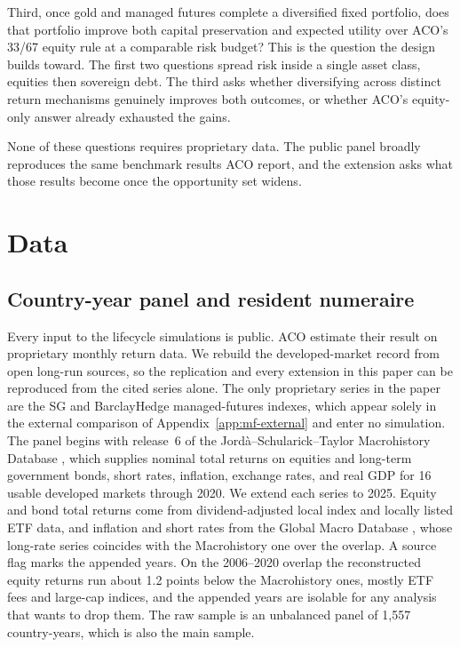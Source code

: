 \documentclass[11pt]{article}
\begin{document}
Third, once gold and managed futures complete a diversified fixed portfolio,
does that portfolio improve both capital preservation and expected utility over
ACO's 33/67 equity rule at a comparable risk budget? This is the question the
design builds toward. The first two questions spread risk inside a single asset
class, equities then sovereign debt. The third asks whether diversifying across
distinct return mechanisms genuinely improves both outcomes, or whether ACO's
equity-only answer already exhausted the gains.

None of these questions requires proprietary data. The public panel broadly
reproduces the same benchmark results ACO report, and the extension asks what
those results become once the opportunity set widens.


\section{Data}
\label{sec:data}

\subsection{Country-year panel and resident numeraire}

Every input to the lifecycle simulations is public. ACO estimate their result
on proprietary monthly return data. We rebuild the developed-market record from
open long-run sources, so the replication and every extension in this paper can
be reproduced from the cited series alone. The only proprietary series in the
paper are the SG and BarclayHedge managed-futures indexes, which appear solely
in the external comparison of Appendix~\ref{app:mf-external} and enter no
simulation. The panel begins with release~6 of the
Jord{\`a}--Schularick--Taylor Macrohistory Database
\citep{MacrohistoryDB,JordaEtAl2019}, which supplies nominal total returns on
equities and long-term government bonds, short rates, inflation, exchange rates, and
real GDP for 16 usable developed markets through 2020. We extend each series to
2025. Equity and bond total returns come from dividend-adjusted local index and
locally listed ETF data, and inflation and short rates from the Global Macro
Database \citep{MullerXuLehbibChen2025}, whose long-rate series coincides with
the Macrohistory one over the overlap. A source flag marks the appended years. On the 2006--2020 overlap the
reconstructed equity returns run about 1.2 points below the Macrohistory ones,
mostly ETF fees and large-cap indices, and the appended years are isolable for
any analysis that wants to drop them. The raw sample is an unbalanced panel of
1,557 country-years, which is also the main sample.
\end{document}
